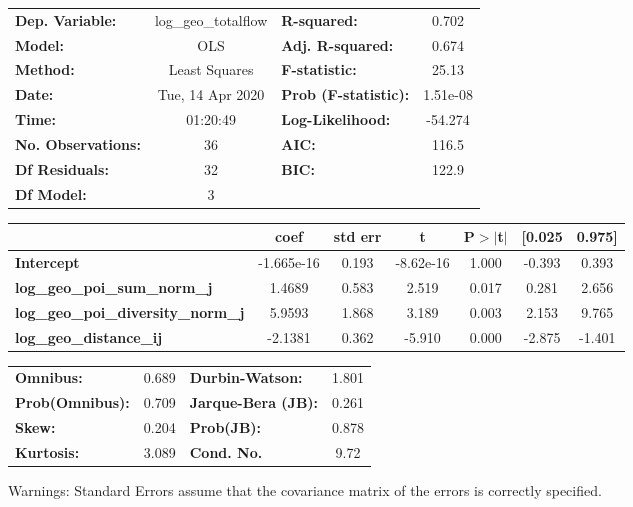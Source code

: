 \begin{center}
\begin{tabular}{lclc}
\toprule
\textbf{Dep. Variable:}                    & log\_geo\_totalflow & \textbf{  R-squared:         } &     0.702   \\
\textbf{Model:}                            &         OLS         & \textbf{  Adj. R-squared:    } &     0.674   \\
\textbf{Method:}                           &    Least Squares    & \textbf{  F-statistic:       } &     25.13   \\
\textbf{Date:}                             &   Tue, 14 Apr 2020  & \textbf{  Prob (F-statistic):} &  1.51e-08   \\
\textbf{Time:}                             &       01:20:49      & \textbf{  Log-Likelihood:    } &   -54.274   \\
\textbf{No. Observations:}                 &            36       & \textbf{  AIC:               } &     116.5   \\
\textbf{Df Residuals:}                     &            32       & \textbf{  BIC:               } &     122.9   \\
\textbf{Df Model:}                         &             3       & \textbf{                     } &             \\
\bottomrule
\end{tabular}
\begin{tabular}{lcccccc}
                                           & \textbf{coef} & \textbf{std err} & \textbf{t} & \textbf{P$> |$t$|$} & \textbf{[0.025} & \textbf{0.975]}  \\
\midrule
\textbf{Intercept}                         &   -1.665e-16  &        0.193     & -8.62e-16  &         1.000        &       -0.393    &        0.393     \\
\textbf{log\_geo\_poi\_sum\_norm\_j}       &       1.4689  &        0.583     &     2.519  &         0.017        &        0.281    &        2.656     \\
\textbf{log\_geo\_poi\_diversity\_norm\_j} &       5.9593  &        1.868     &     3.189  &         0.003        &        2.153    &        9.765     \\
\textbf{log\_geo\_distance\_ij}            &      -2.1381  &        0.362     &    -5.910  &         0.000        &       -2.875    &       -1.401     \\
\bottomrule
\end{tabular}
\begin{tabular}{lclc}
\textbf{Omnibus:}       &  0.689 & \textbf{  Durbin-Watson:     } &    1.801  \\
\textbf{Prob(Omnibus):} &  0.709 & \textbf{  Jarque-Bera (JB):  } &    0.261  \\
\textbf{Skew:}          &  0.204 & \textbf{  Prob(JB):          } &    0.878  \\
\textbf{Kurtosis:}      &  3.089 & \textbf{  Cond. No.          } &     9.72  \\
\bottomrule
\end{tabular}
\end{center}

Warnings: \newline
 [1] Standard Errors assume that the covariance matrix of the errors is correctly specified.